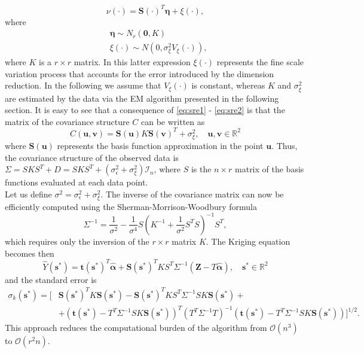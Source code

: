 \documentclass[11pt]{article}
\begin{document}
\begin{equation}
\nu (\cdot) = \bm{S} (\cdot)^T \bm{\eta} + \xi (\cdot),
\label{eq:sre1}
\end{equation} 
where 
\begin{equation}
\begin{split}
&\bm{\eta} \sim N_r (\bm{0}, K)
\\
&\xi (\cdot) \sim N(0, \sigma_\xi^2 V_\xi (\cdot) ),
\end{split}
\label{eq:sre2}
\end{equation}
where $K$ is a $r \times r$ matrix. In this latter expression $\xi(\cdot)$ represents the fine scale variation process that accounts for the error introduced by the dimension reduction. In the following we assume that $V_\xi (\cdot)$ is constant, whereas $K$ and $\sigma_\xi^2$ are estimated by the data via the EM algorithm presented in the following section. It is easy to see that a consequence of \eqref{eq:sre1} - \eqref{eq:sre2} is that the matrix of the covariance structure $C$ can be written as 
\begin{equation*}
C (\bm{u}, \bm{v}) = \bm{S}(\bm{u}) K \bm{S}(\bm{v})^T + \sigma_\xi^2, \quad \bm{u}, \bm{v} \in \mathbb{R}^2
\end{equation*}
where $\bm{S}(\bm{u})$ represents the basis function approximation in the point $\bm{u}$. Thus, the covariance structure of the observed data is $\Sigma = S K S^T + D = S K S^T + (\sigma_\epsilon^2 + \sigma_\xi^2) \mathcal{I}_n$, where $S$ is the $n \times r$ matrix of the basis functions evaluated at each data point.\\

Let us define $\sigma^2 = \sigma_\epsilon^2 + \sigma_\xi^2$. The inverse of the covariance matrix can now be efficiently computed using the Sherman-Morrison-Woodbury formula
$$\Sigma^{-1} = \frac{1}{\sigma^2} - \frac{1}{\sigma^4} S \left( K^{-1} + \frac{1}{\sigma^2}S^T S \right)^{-1} S^T, $$
which requires only the inversion of the $r \times r$ matrix $K$. The Kriging equation becomes then
\begin{equation}
\hat{Y}(\bm{s}^*) = \bm{t}(\bm{s}^*)^T \hat{\bm{\alpha}} + \bm{S}(\bm{s}^*)^T K S^T \Sigma^{-1} (\bm{Z} - T \hat{\bm{\alpha}}), \quad \bm{s}^* \in \mathbb{R}^2
\end{equation}
and the standard error is
\begin{equation}
\begin{split}
\sigma_k(\bm{s}^*) = \big[ &\bm{S}(\bm{s}^*)^T K \bm{S}(\bm{s}^*) - \bm{S}(\bm{s}^*)^T K S^T \Sigma^{-1} S K \bm{S}(\bm{s}^*) + 
\\
&+ (\bm{t}(\bm{s}^*) - T^T \Sigma^{-1} S K \bm{S}(\bm{s}^*))^T (T^T \Sigma^{-1} T)^{-1} (\bm{t}(\bm{s}^*) - T^T \Sigma^{-1} S K \bm{S}(\bm{s}^*)) \big]^{1/2}.
\end{split}
\end{equation}
This approach reduces the computational burden of the algorithm from $\mathcal{O}(n^3)$ to $\mathcal{O}(r^2 n)$.
\end{document}
